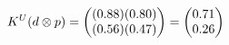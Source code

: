 \documentclass[preview]{standalone}
\begin{document}
\begin{align*}
\special{dvisvgm:raw <g id='unique000'>}K^U(d \otimes p) = \begin{pmatrix} (0.88)(0.80) \\ (0.56)(0.47) \end{pmatrix} = \begin{pmatrix} 0.71 \\ 0.26 \end{pmatrix}\special{dvisvgm:raw </g>}
\end{align*}
\end{document}
